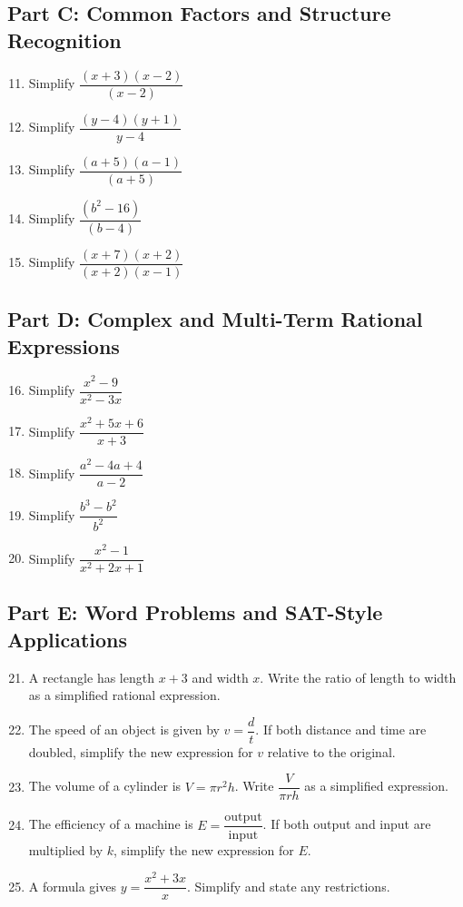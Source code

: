 \documentclass[12pt]{article}
\begin{document}
\subsection*{Part C: Common Factors and Structure Recognition}
\begin{enumerate}
  \setcounter{enumi}{10}
  \item Simplify \(\dfrac{(x + 3)(x - 2)}{(x - 2)}\)
  \item Simplify \(\dfrac{(y - 4)(y + 1)}{y - 4}\)
  \item Simplify \(\dfrac{(a + 5)(a - 1)}{(a + 5)}\)
  \item Simplify \(\dfrac{(b^2 - 16)}{(b - 4)}\)
  \item Simplify \(\dfrac{(x + 7)(x + 2)}{(x + 2)(x - 1)}\)
\end{enumerate}

\subsection*{Part D: Complex and Multi-Term Rational Expressions}
\begin{enumerate}
  \setcounter{enumi}{15}
  \item Simplify \(\dfrac{x^2 - 9}{x^2 - 3x}\)
  \item Simplify \(\dfrac{x^2 + 5x + 6}{x + 3}\)
  \item Simplify \(\dfrac{a^2 - 4a + 4}{a - 2}\)
  \item Simplify \(\dfrac{b^3 - b^2}{b^2}\)
  \item Simplify \(\dfrac{x^2 - 1}{x^2 + 2x + 1}\)
\end{enumerate}

\subsection*{Part E: Word Problems and SAT-Style Applications}
\begin{enumerate}
  \setcounter{enumi}{20}
  \item A rectangle has length \(x + 3\) and width \(x\). Write the ratio of length to width as a simplified rational expression.
  \item The speed of an object is given by \(v = \dfrac{d}{t}\). If both distance and time are doubled, simplify the new expression for \(v\) relative to the original.
  \item The volume of a cylinder is \(V = \pi r^2h\). Write \(\dfrac{V}{\pi r h}\) as a simplified expression.
  \item The efficiency of a machine is \(E = \dfrac{\text{output}}{\text{input}}\). If both output and input are multiplied by \(k\), simplify the new expression for \(E\).
  \item A formula gives \(y = \dfrac{x^2 + 3x}{x}\). Simplify and state any restrictions.
\end{enumerate}
\end{document}
